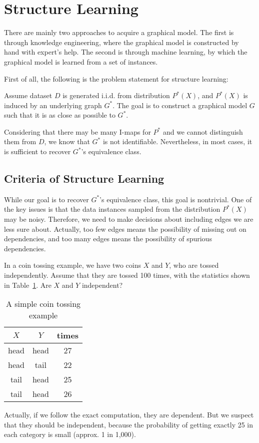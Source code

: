 \section{Structure Learning}

There are mainly two approaches to acquire a graphical model. The first is through knowledge engineering, where the graphical model is constructed by hand with expert’s help. The second is through machine learning, by which  the graphical model is learned from a set of instances. 

First of all, the following is the problem statement for structure learning: 
\begin{tcolorbox}
Assume dataset $D$ is generated i.i.d. from distribution $P^*(X)$, and $P^*(X)$ is induced by an underlying graph $G^*$. The goal is to construct a graphical model $G$ such that it is as close as possible to $G^*$. 
\end{tcolorbox}

Considering that there may be many I-maps for $P^*$ and we cannot distinguish them from $D$, we know that $G^*$ is not identifiable. Nevertheless, in most cases, it is sufficient to recover $G^*$'s equivalence class. 

\subsection{Criteria of Structure Learning}

While our goal is to recover $G^*$'s equivalence class, this goal is nontrivial. One of the key issues is that the data instances sampled from the distribution $P^*(X)$ may be noisy. Therefore, we need to make decisions about including edges we are less sure about. Actually, too few edges means the possibility of missing out on dependencies, and too many edges means the possibility of spurious dependencies. 

\begin{example}
In a coin tossing example, we have two coins $X$ and $Y$, who are tossed independently. Assume that they are tossed 100 times, with the statistics shown in Table~\ref{tab:cointossingstructurallearning}. 
Are $X$ and $Y$ independent? 
\begin{table}[!htbp]
    \centering
    \begin{tabular}{|c|c|c|}
    \hline
    $X$ & $Y$ & times \\
    \hline
    head  & head & 27 \\
    head  & tail & 22 \\
    tail  & head & 25 \\
    tail  & head & 26 \\
    \hline
    \end{tabular}
    \caption{A simple coin tossing example}
    \label{tab:cointossingstructurallearning}
\end{table}
Actually, if we follow the exact computation, they are dependent. But we suspect that they should be independent, because the probability of getting exactly 25 in each category is small (approx. 1 in 1,000). 
\end{example}

